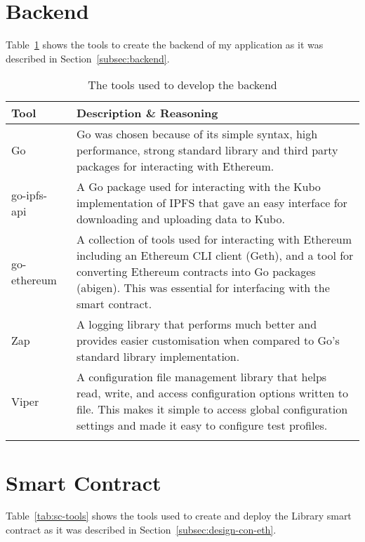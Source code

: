 
\section{Backend}

Table~\ref{tab:backend-tools} shows the tools to create the backend of my application as it was described in Section~\ref{subsec:backend}.

\begin{longtable}{p{} p{}}
  \toprule
  \textbf{Tool} & \textbf{Description \& Reasoning}
  \\\midrule\midrule
  Go~\cite{noauthor_go_nodate}
  & \small Go was chosen because of its simple syntax, high performance, strong standard library and third party packages for interacting with Ethereum.
  \\
  go-ipfs-api~\cite{noauthor_go-ipfs-api_2023}
  & \small A Go package used for interacting with the Kubo implementation of IPFS that gave an easy interface for downloading and uploading data to Kubo.\\
  go-ethereum~\cite{noauthor_go-ethereum_nodate}
  & \small A collection of tools used for interacting with Ethereum including an Ethereum CLI client (Geth), and a tool for converting Ethereum contracts into Go packages (abigen). This was essential for interfacing with the smart contract.\\
  Zap~\cite{noauthor_zap_2023}
  & \small A logging library that performs much better and provides easier customisation when compared to Go's standard library implementation. \\
  Viper~\cite{noauthor_viper_nodate}
  & \small A configuration file management library that helps read, write, and access configuration options written to file. This makes it simple to access global configuration settings and made it easy to configure test profiles.
  \\\bottomrule\bottomrule
  \caption{The tools used to develop the backend}
  \label{tab:backend-tools}
\end{longtable}

\section{Smart Contract}\label{sec:impl-deploy}

Table~\ref{tab:sc-tools} shows the tools used to create and deploy the Library smart contract as it was described in Section~\ref{subsec:design-con-eth}.

